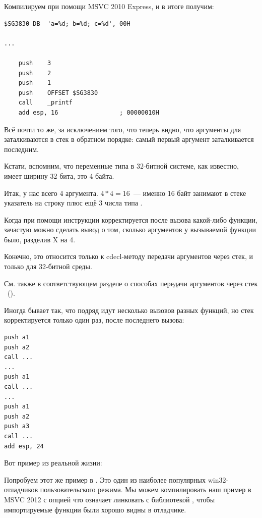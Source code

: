 

Компилируем при помощи MSVC 2010 Express, и в итоге получим:

\begin{lstlisting}
$SG3830	DB	'a=%d; b=%d; c=%d', 00H

...

	push	3
	push	2
	push	1
	push	OFFSET $SG3830
	call	_printf
	add	esp, 16					; 00000010H
\end{lstlisting}

Всё почти то же, за исключением того, что теперь видно, что аргументы для \printf заталкиваются в стек в обратном порядке: самый первый аргумент заталкивается последним.

Кстати, вспомним, что переменные типа \Tint в 32-битной системе, как известно, имеет ширину 32 бита, это 4 байта.

Итак, у нас всего 4 аргумента. $4*4 = 16$~--- именно 16 байт занимают в стеке указатель на строку плюс ещё 3 числа типа \Tint.

Когда при помощи инструкции  корректируется  \ESP 
после вызова какой-либо функции, зачастую можно сделать вывод о том, сколько аргументов 
у вызываемой функции было, разделив X на 4.

Конечно, это относится только к cdecl-методу передачи аргументов через стек, и только для 32-битной среды.

См. также в соответствующем разделе о способах передачи аргументов через стек ~().

Иногда бывает так, что подряд идут несколько вызовов разных функций, но стек корректируется только один раз, после последнего вызова:

\begin{lstlisting}
push a1
push a2
call ...
...
push a1
call ...
...
push a1
push a2
push a3
call ...
add esp, 24
\end{lstlisting}

Вот пример из реальной жизни:



\clearpage
{}
\myindex{\olly}

Попробуем этот же пример в \olly.
Это один из наиболее популярных win32-отладчиков пользовательского режима.
Мы можем компилировать наш пример в MSVC 2012 
с опцией  что означает линковать с библиотекой ,
чтобы импортируемые функции были хорошо видны в отладчике.

